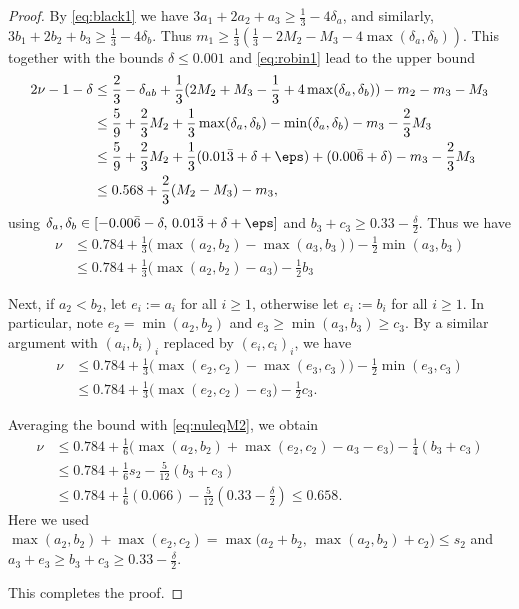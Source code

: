 \begin{proof}
By \eqref{eq:black1} we have $3a_1 + 2a_2 + a_3 \ge \frac{1}{3}-4\delta_a$, and similarly,
$3b_1 + 2b_2 +b_3 \ge \frac{1}{3}-4\delta_b$. Thus $m_1 \ge \frac{1}{3}(\frac{1}{3}-2M_2 - M_3-4\max(\delta_a,\delta_b))$.
This together with the bounds $\delta\leq 0.001$ and \eqref{eq:robin1} lead to the upper bound
\begin{align*}
2\nu-1 -\delta
& \le \frac{2}{3}
-\delta_{ab}
+ \frac{1}{3}(2M_2 + M_3-\frac{1}{3}+4\max(\delta_a,\delta_b)) - m_2 - m_3 - M_3 \\
& \le \frac{5}{9} +  \frac{2}{3}M_2
+\frac{1}{3}\max(\delta_a,\delta_b)- \min(\delta_a,\delta_b)
- m_3 - \frac{2}{3}M_3  \\
&\le \frac{5}{9} +  \frac{2}{3}M_2+
\frac{1}{3}(0.01\bar{3}+\delta+\eps) + (0.00\bar{6}+\delta)
- m_3 - \frac{2}{3}M_3\\
&\le 0.568+\frac{2}{3}(M_2-M_3)- m_3,
\end{align*}
using $\delta_a,\delta_b\in [-0.00\bar{6}-\delta,\, 0.01\bar{3}+\delta+\eps]$ and $b_3 + c_3 \ge 0.33 - \frac{\delta}{2}$. Thus we have
\begin{align}\label{eq:nuleqM2}
\nu & \le 0.784 + \frac{1}{3}\big(\max(a_2,b_2)-\max(a_3,b_3)\big) - \frac{1}{2}\min(a_3,b_3) \nonumber\\
&\le 0.784 + \frac{1}{3}\big(\max(a_2,b_2)-a_3\big) - \frac{1}{2}b_3
\end{align}


Next, if $a_2<b_2$, let $e_i := a_i$ for all $i\ge1$, otherwise let $e_i := b_i$ for all $i\ge1$. In particular, note $e_2 = \min(a_2,b_2)$ and $e_3 \ge \min(a_3,b_3)\ge c_3$. By a similar argument with $(a_i,b_i)_i$ replaced by $(e_i,c_i)_i$, we have
\begin{align*}
\nu &\le 0.784 + \frac{1}{3}\big(\max(e_2,c_2)-\max(e_3,c_3)\big) - \frac{1}{2}\min(e_3,c_3)\\
&\le 0.784 + \frac{1}{3}\big(\max(e_2,c_2)-e_3\big) - \frac{1}{2}c_3.
\end{align*}

Averaging the bound with \eqref{eq:nuleqM2}, we obtain
\begin{align}
\nu &\le 0.784 + \frac{1}{6}\big(\max(a_2,b_2)+\max(e_2,c_2)-a_3-e_3\big) - \frac{1}{4}(b_3+c_3) \nonumber\\
&\le 0.784 + \frac{1}{6}s_2 - \frac{5}{12}(b_3+c_3) \nonumber\\
&\le 0.784 + \frac{1}{6}(0.066) - \frac{5}{12}(0.33 - \tfrac{\delta}{2})
 \le 0.658.
\end{align}
Here we used $\max(a_2,b_2)+\max(e_2,c_2) = \max\big(a_2+b_2, \, \max(a_2,b_2) + c_2\big) \le s_2$ and $a_3+e_3 \ge b_3+c_3 \ge 0.33 - \frac{\delta}{2}$.

This completes the proof.

\end{proof}

